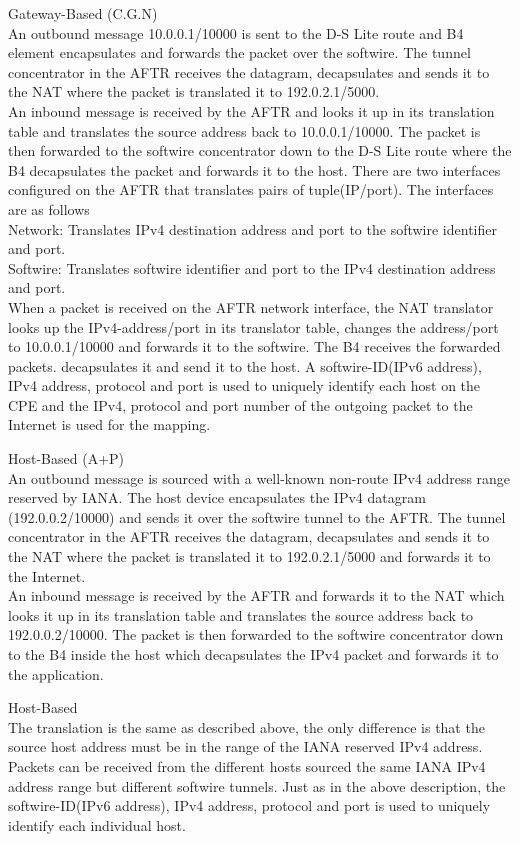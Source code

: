 \documentclass[iwp,first]{luthesis}
\begin{document}
Gateway-Based (C.G.N)
\\An outbound message 10.0.0.1/10000 is sent to the D-S Lite route and B4 element encapsulates and forwards the packet over the softwire. The tunnel concentrator in the AFTR receives the datagram, decapsulates and sends it to the NAT where the packet is translated it to 192.0.2.1/5000.
\\An inbound message is received by the AFTR and looks it up in its translation table and translates the source address back to 10.0.0.1/10000. The packet is then forwarded to the softwire concentrator down to the D-S Lite route where the B4 decapsulates the packet and forwards it to the host.
There are two interfaces configured on the AFTR that translates pairs of tuple(IP/port). The interfaces are as follows
\\Network:  Translates IPv4 destination address and port to the softwire identifier and port.
\\Softwire: Translates softwire identifier and port to the IPv4 destination address and port.
\\When a packet is received on the AFTR network interface, the NAT translator looks up the IPv4-address/port in its translator table, changes the address/port to 10.0.0.1/10000 and forwards it to the softwire. The B4 receives the forwarded packets. decapsulates it and send it to the host. A softwire-ID(IPv6 address), IPv4 address, protocol and port is used to uniquely identify each host on the CPE and the IPv4, protocol and port number of the outgoing packet to the Internet is used for the mapping.


Host-Based (A+P)
\\An outbound message is sourced with a well-known non-route IPv4 address range reserved by IANA. The host device encapsulates the IPv4 datagram (192.0.0.2/10000) and sends it over the softwire tunnel to the AFTR. The tunnel concentrator in the AFTR receives the datagram, decapsulates and sends it to the NAT where the packet is translated it to 192.0.2.1/5000 and forwards it to the Internet.
\\An inbound message is received by the AFTR and forwards it to the NAT which looks it up in its translation table and translates the source address back to 192.0.0.2/10000. The packet is then forwarded to the softwire concentrator down to the B4 inside the host which decapsulates the IPv4 packet and forwards it to the application.

Host-Based
\\The translation is the same as described above, the only difference is that the source host address must be in the range of the IANA reserved IPv4 address. Packets can be received from the different hosts sourced the same IANA IPv4 address range but different softwire tunnels. Just as in the above description, the  softwire-ID(IPv6 address), IPv4 address, protocol and port is used to uniquely identify each individual host.
\end{document}
